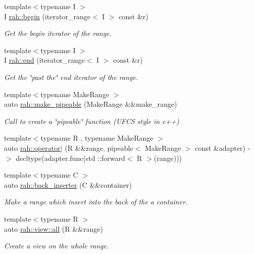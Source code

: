 \begin{DoxyCompactItemize}
{\footnotesize template$<$typename I $>$ }\\I \mbox{\hyperlink{namespacerah_a14e69321e6772651b349cb31467ea3a2}{rah\+::begin}} (iterator\+\_\+range$<$ I $>$ const \&r)
\begin{DoxyCompactList}\small\item\em Get the begin iterator of the range. \end{DoxyCompactList}\item 
{\footnotesize template$<$typename I $>$ }\\I \mbox{\hyperlink{namespacerah_a6b31fe80bf81abf3149df010cb265e20}{rah\+::end}} (iterator\+\_\+range$<$ I $>$ const \&r)
\begin{DoxyCompactList}\small\item\em Get the \char`\"{}past the\char`\"{} end iterator of the range. \end{DoxyCompactList}\item 
{\footnotesize template$<$typename Make\+Range $>$ }\\auto \mbox{\hyperlink{namespacerah_a9beb2a94a054fd0caefd5a20b1c0f0d9}{rah\+::make\+\_\+pipeable}} (Make\+Range \&\&make\+\_\+range)
\begin{DoxyCompactList}\small\item\em Call to create a \char`\"{}pipeable\char`\"{} function (U\+F\+CS style in c++) \end{DoxyCompactList}\item 
{\footnotesize template$<$typename R , typename Make\+Range $>$ }\\auto \mbox{\hyperlink{namespacerah_ab1ae71c44092414b8a22379bc0d3cd34}{rah\+::operator$\vert$}} (R \&\&range, pipeable$<$ Make\+Range $>$ const \&adapter) -\/$>$ decltype(adapter.\+func(std \+::forward$<$ R $>$(range)))
\item 
{\footnotesize template$<$typename C $>$ }\\auto \mbox{\hyperlink{namespacerah_a0698f952bc3c4f1961929bbddb5812fe}{rah\+::back\+\_\+inserter}} (C \&\&container)
\begin{DoxyCompactList}\small\item\em Make a range which insert into the back of the a container. \end{DoxyCompactList}\item 
{\footnotesize template$<$typename R $>$ }\\auto \mbox{\hyperlink{namespacerah_1_1view_acc7f1420accc862d2ac433ba9c697e95}{rah\+::view\+::all}} (R \&\&range)
\begin{DoxyCompactList}\small\item\em Create a view on the whole range. \end{DoxyCompactList}\item 

\end{DoxyCompactItemize}
